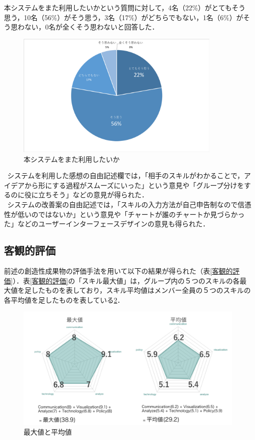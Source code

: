 \documentclass{funthesis}
\begin{document}
本システムをまた利用したいかという質問に対して，4名（22\%）がとてもそう思う，10名（56\%）がそう思う，3名（17\%）がどちらでもない，1名（6\%）がそう思わない，0名が全くそう思わないと回答した．
\begin{figure}[H]
 \centering
   \includegraphics[width=100mm]{honban1.png}
 \caption{本システムをまた利用したいか}
 \label{testtest}
\end{figure}

\ システムを利用した感想の自由記述欄では，「相手のスキルがわかることで，アイデアから形にする過程がスムーズにいった」という意見や「グループ分けをするのに役に立ちそう」などの意見が得られた．\\
\ システムの改善案の自由記述では，「スキルの入力方法が自己申告制なので信憑性が低いのではないか」という意見や「チャートが誰のチャートか見づらかった」などのユーザーインターフェースデザインの意見も得られた．

\subsection{客観的評価}
前述の創造性成果物の評価手法を用いて以下の結果が得られた（表\ref{客観的評価}）．表\ref{客観的評価}の「スキル最大値」は，グループ内の５つのスキルの各最大値を足したものを表しており，スキル平均値はメンバー全員の５つのスキルの各平均値を足したものを表している\ref{ex}．\\
\begin{figure}[h]
 \centering
   \includegraphics[width=120mm]{figures/extest.png}
 \caption{最大値と平均値}
 \label{ex}
\end{figure}
\end{document}
